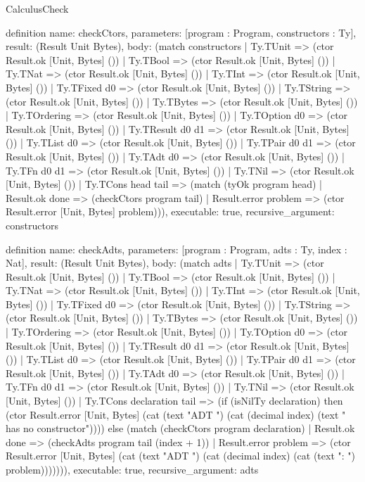 \begin{lexlean}{CalculusCheck}
\begin{semanticmodule}
definition{
  name: checkCtors,
  parameters: [program : Program, constructors : Ty],
  result: (Result Unit Bytes),
  body: (match constructors
    | Ty.TUnit => (ctor Result.ok [Unit, Bytes] ())
    | Ty.TBool => (ctor Result.ok [Unit, Bytes] ())
    | Ty.TNat => (ctor Result.ok [Unit, Bytes] ())
    | Ty.TInt => (ctor Result.ok [Unit, Bytes] ())
    | Ty.TFixed d0 => (ctor Result.ok [Unit, Bytes] ())
    | Ty.TString => (ctor Result.ok [Unit, Bytes] ())
    | Ty.TBytes => (ctor Result.ok [Unit, Bytes] ())
    | Ty.TOrdering => (ctor Result.ok [Unit, Bytes] ())
    | Ty.TOption d0 => (ctor Result.ok [Unit, Bytes] ())
    | Ty.TResult d0 d1 => (ctor Result.ok [Unit, Bytes] ())
    | Ty.TList d0 => (ctor Result.ok [Unit, Bytes] ())
    | Ty.TPair d0 d1 => (ctor Result.ok [Unit, Bytes] ())
    | Ty.TAdt d0 => (ctor Result.ok [Unit, Bytes] ())
    | Ty.TFn d0 d1 => (ctor Result.ok [Unit, Bytes] ())
    | Ty.TNil => (ctor Result.ok [Unit, Bytes] ())
    | Ty.TCons head tail => (match (tyOk program head)
      | Result.ok done => (checkCtors program tail)
      | Result.error problem => (ctor Result.error [Unit, Bytes] problem))),
  executable: true,
  recursive_argument: constructors
}

definition{
  name: checkAdts,
  parameters: [program : Program, adts : Ty, index : Nat],
  result: (Result Unit Bytes),
  body: (match adts
    | Ty.TUnit => (ctor Result.ok [Unit, Bytes] ())
    | Ty.TBool => (ctor Result.ok [Unit, Bytes] ())
    | Ty.TNat => (ctor Result.ok [Unit, Bytes] ())
    | Ty.TInt => (ctor Result.ok [Unit, Bytes] ())
    | Ty.TFixed d0 => (ctor Result.ok [Unit, Bytes] ())
    | Ty.TString => (ctor Result.ok [Unit, Bytes] ())
    | Ty.TBytes => (ctor Result.ok [Unit, Bytes] ())
    | Ty.TOrdering => (ctor Result.ok [Unit, Bytes] ())
    | Ty.TOption d0 => (ctor Result.ok [Unit, Bytes] ())
    | Ty.TResult d0 d1 => (ctor Result.ok [Unit, Bytes] ())
    | Ty.TList d0 => (ctor Result.ok [Unit, Bytes] ())
    | Ty.TPair d0 d1 => (ctor Result.ok [Unit, Bytes] ())
    | Ty.TAdt d0 => (ctor Result.ok [Unit, Bytes] ())
    | Ty.TFn d0 d1 => (ctor Result.ok [Unit, Bytes] ())
    | Ty.TNil => (ctor Result.ok [Unit, Bytes] ())
    | Ty.TCons declaration tail => (if (isNilTy declaration) then (ctor Result.error [Unit, Bytes] (cat (text "ADT ") (cat (decimal index) (text " has no constructor")))) else (match (checkCtors program declaration)
      | Result.ok done => (checkAdts program tail (index + 1))
      | Result.error problem => (ctor Result.error [Unit, Bytes] (cat (text "ADT ") (cat (decimal index) (cat (text ": ") problem))))))),
  executable: true,
  recursive_argument: adts
}


\end{semanticmodule}
\end{lexlean}

